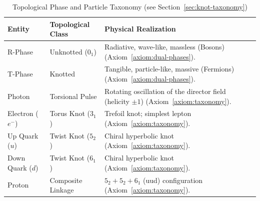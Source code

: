 \documentclass[10pt,reprint,aps,onecolumn,nofootinbib]{revtex4-2}
\begin{document}
                \begin{table}[h!]
                    \centering
                    \scriptsize
                    \caption{Topological Phase and Particle Taxonomy (see Section~\ref{sec:knot-taxonomy})}
                    \label{tab:glossary-taxonomy}
                    \renewcommand{\arraystretch}{1.5}
                    \begin{tabular}{|l|l|l|}
                        \hline
                        \textbf{Entity} & \textbf{Topological Class} & \textbf{Physical Realization} \\
                        \hline
                        R-Phase & Unknotted ($0_1$) & Radiative, wave-like, massless (Bosons) (Axiom~\ref{axiom:dual-phases}). \\
                        \hline
                        T-Phase & Knotted & Tangible, particle-like, massive (Fermions) (Axiom~\ref{axiom:dual-phases}). \\
                        \hline
                        Photon & Torsional Pulse & Rotating oscillation of the director field (helicity $\pm 1$) (Axiom~\ref{axiom:taxonomy}). \\
                        \hline
                        Electron ($e^-$) & Torus Knot ($3_1$) & Trefoil knot; simplest lepton (Axiom~\ref{axiom:taxonomy}). \\
                        \hline
                        Up Quark ($u$) & Twist Knot ($5_2$) & Chiral hyperbolic knot (Axiom~\ref{axiom:taxonomy}). \\
                        \hline
                        Down Quark ($d$) & Twist Knot ($6_1$) & Chiral hyperbolic knot (Axiom~\ref{axiom:taxonomy}). \\
                        \hline
                        Proton & Composite Linkage & $5_2 + 5_2 + 6_1$ (uud) configuration (Axiom~\ref{axiom:taxonomy}). \\
                        \hline
                    \end{tabular}
                \end{table}
\end{document}
